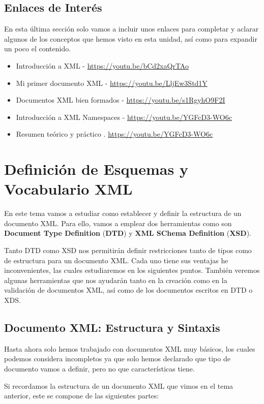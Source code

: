 \section{Enlaces de Interés}
En esta última sección solo vamos a incluir unos enlaces para completar y aclarar algunos de los conceptos que hemos visto en esta unidad, así como para expandir un poco el contenido.

\begin{itemize}
    \item Introducción a XML - \url{https://youtu.be/bCd2xaQrTAo}
    \item Mi primer documento XML - \url{https://youtu.be/LljEw3Std1Y}
    \item Documentos XML bien formados - \url{https://youtu.be/s1RgyhO9F2I}
    \item Introducción a XML Namespaces - \url{https://youtu.be/YGFcD3-WO6c}
    \item Resumen teórico y práctico . \url{https://youtu.be/YGFcD3-WO6c}
\end{itemize}

\chapter{Definición de Esquemas y Vocabulario XML}

En este tema vamos a estudiar como establecer y definir la estructura de un documento XML. Para ello, vamos a emplear dos herramientas como son \textbf{Document Type Definition} (\textbf{DTD}) y \textbf{XML SChema Definition} (\textbf{XSD}).

Tanto DTD como XSD nos permitirán definir restricciones tanto de tipos como de estructura para un documento XML. Cada uno tiene sus ventajas he inconvenientes, las cuales estudiaremos en los siguientes puntos. También veremos algunas herramientas que nos ayudarán tanto en la creación como en la validación de documentos XML, así como de los documentos escritos en DTD o XDS.

\section{Documento XML: Estructura y Sintaxis}
Hasta ahora solo hemos trabajado con documentos XML muy básicos, los cuales podemos considera incompletos ya que solo hemos declarado que tipo de documento vamos a definir, pero no que características tiene.

Si recordamos la estructura de un documento XML que vimos en el tema anterior, este se compone de las siguientes partes:

